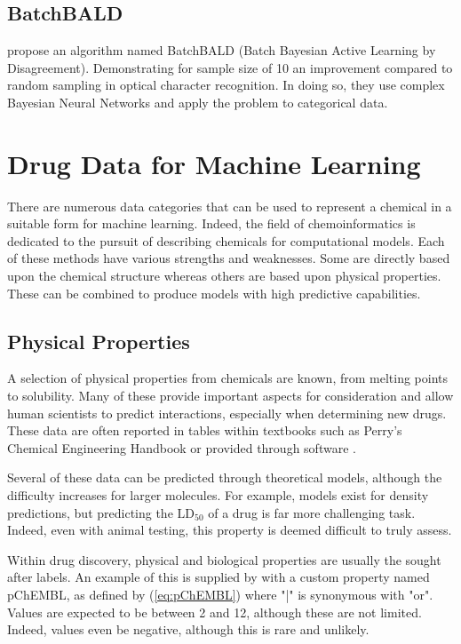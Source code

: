 \subsection{BatchBALD}
\textcite{BatchBALD} propose an algorithm named BatchBALD (Batch Bayesian Active Learning by Disagreement). Demonstrating for sample size of 10 an improvement compared to random sampling in optical character recognition. In doing so, they use complex Bayesian Neural Networks and apply the problem to categorical data.

\section{Drug Data for Machine Learning}
There are numerous data categories that can be used to represent a chemical in a suitable form for machine learning. Indeed, the field of chemoinformatics is dedicated to the pursuit of describing chemicals for computational models. Each of these methods have various strengths and weaknesses. Some are directly based upon the chemical structure whereas others are based upon physical properties. These can be combined to produce models with high predictive capabilities.

\subsection{Physical Properties}
A selection of physical properties from chemicals are known, from melting points to solubility. Many of these provide important aspects for consideration and allow human scientists to predict interactions, especially when determining new drugs. These data are often reported in tables within textbooks such as Perry's Chemical Engineering Handbook or provided through software \cite{CHEMBL,Perrys}.

Several of these data can be predicted through theoretical models, although the difficulty increases for larger molecules. For example, models exist for density predictions, but predicting the $\mathrm{LD_{50}}$ of a drug is  far more challenging task. Indeed, even with animal testing, this property is deemed difficult to truly assess.

Within drug discovery, physical and biological properties are usually the sought after labels. An example of this is supplied by \textcite{CHEMBL} with a custom property named pChEMBL, as defined by (\ref{eq:pChEMBL}) where "|" is synonymous with "or". Values are expected to be between 2 and 12, although these are not limited. Indeed, values even be negative, although this is rare and unlikely.

